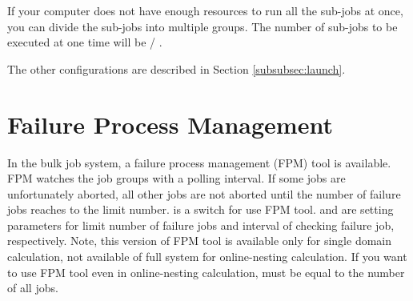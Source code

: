If your computer does not have enough resources to run all the sub-jobs at once, you can divide the sub-jobs into multiple groups.
The number of sub-jobs to be executed at one time will be  / .


The other configurations are described in Section \ref{subsubsec:launch}.


\section{Failure Process Management}
In the \scalerm bulk job system, a failure process management (FPM) tool is available. FPM watches the job groups with a polling interval.
If some jobs are unfortunately aborted, all other jobs are not aborted until the number of failure jobs reaches to the limit number.
 is a switch for use FPM tool.
 and  are setting parameters for limit number of failure jobs and interval of checking failure job, respectively.
Note, this version of FPM tool is available only for single domain calculation, not available of full system for online-nesting calculation. If you want to use FPM tool even in online-nesting calculation,
 must be equal to the number of all jobs.



